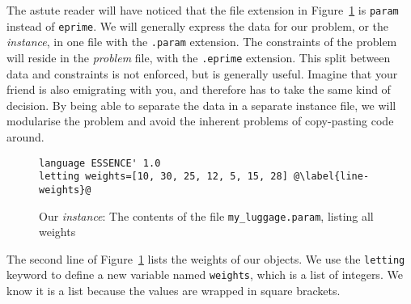 The astute reader will have noticed that the file extension in
Figure~\ref{fig-knapsack1param} is \texttt{param} instead of \texttt{eprime}.
We will generally express the data for our problem, or the \emph{instance},  in
one file with the \texttt{.param} extension.  The constraints of the problem
will reside in the \emph{problem} file, with the \texttt{.eprime} extension.
This split between data and constraints is not enforced, but is generally
useful.  Imagine that your friend is also emigrating with you, and therefore
has to take the same kind of decision. By being able to separate the data in a
separate instance file, we will modularise the problem and avoid the inherent
problems of copy-pasting code around.

\begin{figure}
\begin{lstlisting}
language ESSENCE' 1.0
letting weights=[10, 30, 25, 12, 5, 15, 28] @\label{line-weights}@
\end{lstlisting}
    \caption{Our \emph{instance}: The contents of the file
    \texttt{my\_luggage.param}, listing all weights}
\label{fig-knapsack1param}
\end{figure}

The second line of Figure~\ref{fig-knapsack1param} lists the
weights of our objects. We use the \texttt{letting} keyword to define a new
variable named \texttt{weights}, which is a list of integers.  We know it
is a list because the values are wrapped in square brackets.

